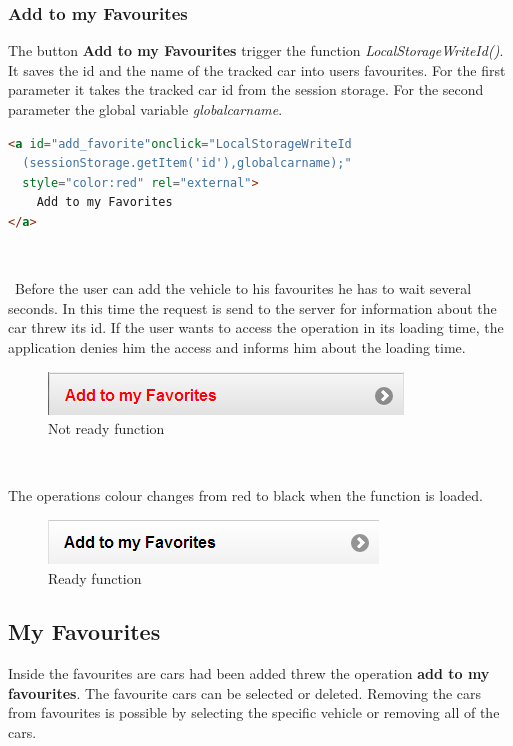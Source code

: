 \subsubsection{Add to my Favourites}
The button \textbf{Add to my Favourites} trigger the function \textit{LocalStorageWriteId()}. It saves the id and the name of the tracked car into users favourites. For the first parameter it takes the tracked car id from the session storage. For the second parameter the global variable \textit{globalcarname}.
\\

\begin{lstlisting}[language=html, caption= 
add favourite sorce code,captionpos=b]
<a id="add_favorite"onclick="LocalStorageWriteId
  (sessionStorage.getItem('id'),globalcarname);"
  style="color:red" rel="external">
    Add to my Favorites
</a>
\end{lstlisting}
\

\
Before the user can add the vehicle to his favourites he has to wait several seconds. In this time the request is send to the server for information about the car threw its id. If the user wants to access the operation in its loading time, the application denies him the access and informs him about the loading time.
\\

\begin{figure}[h]
\centering
\includegraphics[width=0.65\linewidth]{graphics/chapter4/11}
\caption{Not ready function}
\end{figure}
\

The operations colour changes from red to black when the function is loaded.
\\
\begin{figure}[h]
\centering
\includegraphics[width=0.65\linewidth]{graphics/chapter4/12}
\caption{Ready function}
\end{figure}
\newpage

\subsection{My Favourites}
Inside the favourites are cars had been added threw the operation \textbf{add to my favourites}. The favourite cars can be selected or deleted. Removing the cars from favourites is possible by selecting the specific vehicle or removing all of the cars.
\\

